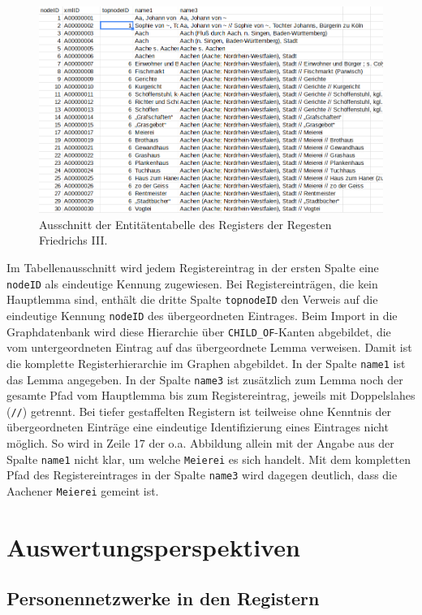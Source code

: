 \documentclass[ngerman,]{scrreprt}
\begin{document}
\begin{figure}
\centering
\includegraphics{Bilder/RI2Graph/RegisterF3-Hierarchie.png}
\caption{Ausschnitt der Entitätentabelle des Registers der Regesten Friedrichs III.}
\end{figure}

Im Tabellenausschnitt wird jedem Registereintrag in der ersten Spalte eine \texttt{nodeID} als eindeutige Kennung zugewiesen. Bei Registereinträgen, die kein Hauptlemma sind, enthält die dritte Spalte \texttt{topnodeID} den Verweis auf die eindeutige Kennung \texttt{nodeID} des übergeordneten Eintrages. Beim Import in die Graphdatenbank wird diese Hierarchie über \texttt{CHILD\_OF}-Kanten abgebildet, die vom untergeordneten Eintrag auf das übergeordnete Lemma verweisen. Damit ist die komplette Registerhierarchie im Graphen abgebildet. In der Spalte \texttt{name1} ist das Lemma angegeben. In der Spalte \texttt{name3} ist zusätzlich zum Lemma noch der gesamte Pfad vom Hauptlemma bis zum Registereintrag, jeweils mit Doppelslahes (\texttt{//}) getrennt. Bei tiefer gestaffelten Registern ist teilweise ohne Kenntnis der übergeordneten Einträge eine eindeutige Identifizierung eines Eintrages nicht möglich. So wird in Zeile 17 der o.a. Abbildung allein mit der Angabe aus der Spalte \texttt{name1} nicht klar, um welche \texttt{Meierei} es sich handelt. Mit dem kompletten Pfad des Registereintrages in der Spalte \texttt{name3} wird dagegen deutlich, dass die Aachener \texttt{Meierei} gemeint ist.

\section{Auswertungsperspektiven}\label{auswertungsperspektiven}

\subsection{Personennetzwerke in den Registern}\label{personennetzwerke-in-den-registern}
\end{document}
